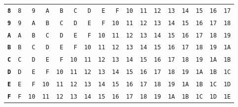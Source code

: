 \begin{tabular}{rrrrrrrrrrrrrrrrr}
\textbf{\texttt{8}} & \texttt{8} & \texttt{9} & \texttt{A} & \texttt{B} & \texttt{C} & \texttt{D} & \texttt{E} & \texttt{F} & \texttt{10} & \texttt{11} & \texttt{12} & \texttt{13} & \texttt{14} & \texttt{15} & \texttt{16} & \texttt{17}\\
\textbf{\texttt{9}} & \texttt{9} & \texttt{A} & \texttt{B} & \texttt{C} & \texttt{D} & \texttt{E} & \texttt{F} & \texttt{10} & \texttt{11} & \texttt{12} & \texttt{13} & \texttt{14} & \texttt{15} & \texttt{16} & \texttt{17} & \texttt{18}\\
\textbf{\texttt{A}} & \texttt{A} & \texttt{B} & \texttt{C} & \texttt{D} & \texttt{E} & \texttt{F} & \texttt{10} & \texttt{11} & \texttt{12} & \texttt{13} & \texttt{14} & \texttt{15} & \texttt{16} & \texttt{17} & \texttt{18} & \texttt{19}\\
\textbf{\texttt{B}} & \texttt{B} & \texttt{C} & \texttt{D} & \texttt{E} & \texttt{F} & \texttt{10} & \texttt{11} & \texttt{12} & \texttt{13} & \texttt{14} & \texttt{15} & \texttt{16} & \texttt{17} & \texttt{18} & \texttt{19} & \texttt{1A}\\
\textbf{\texttt{C}} & \texttt{C} & \texttt{D} & \texttt{E} & \texttt{F} & \texttt{10} & \texttt{11} & \texttt{12} & \texttt{13} & \texttt{14} & \texttt{15} & \texttt{16} & \texttt{17} & \texttt{18} & \texttt{19} & \texttt{1A} & \texttt{1B}\\
\textbf{\texttt{D}} & \texttt{D} & \texttt{E} & \texttt{F} & \texttt{10} & \texttt{11} & \texttt{12} & \texttt{13} & \texttt{14} & \texttt{15} & \texttt{16} & \texttt{17} & \texttt{18} & \texttt{19} & \texttt{1A} & \texttt{1B} & \texttt{1C}\\
\textbf{\texttt{E}} & \texttt{E} & \texttt{F} & \texttt{10} & \texttt{11} & \texttt{12} & \texttt{13} & \texttt{14} & \texttt{15} & \texttt{16} & \texttt{17} & \texttt{18} & \texttt{19} & \texttt{1A} & \texttt{1B} & \texttt{1C} & \texttt{1D}\\
\textbf{\texttt{F}} & \texttt{F} & \texttt{10} & \texttt{11} & \texttt{12} & \texttt{13} & \texttt{14} & \texttt{15} & \texttt{16} & \texttt{17} & \texttt{18} & \texttt{19} & \texttt{1A} & \texttt{1B} & \texttt{1C} & \texttt{1D} & \texttt{1E}\\
\bottomrule
\end{tabular}

